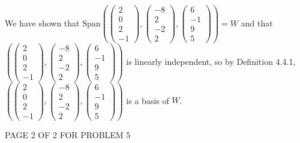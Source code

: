 \documentclass[12pt]{article}
\newenvironment{problem}[2][Problem]
{
	\begin{trivlist} 
		\item[\hskip \labelsep {\bfseries #1 #2:}]
	}
{
	\end{trivlist}
	}
\begin{document}
\begin{problem}{5}
We have shown that $\text{Span}\left( \begin{pmatrix} 2\\0\\2\\-1 \end{pmatrix}, \begin{pmatrix} -8\\2\\-2\\2 \end{pmatrix}, \begin{pmatrix} 6\\-1\\9\\5 \end{pmatrix} \right)=W$ and that $\left( \begin{pmatrix} 2\\0\\2\\-1 \end{pmatrix}, \begin{pmatrix} -8\\2\\-2\\2 \end{pmatrix}, \begin{pmatrix} 6\\-1\\9\\5 \end{pmatrix} \right)$ is linearly independent, so by Definition 4.4.1, $\left( \begin{pmatrix} 2\\0\\2\\-1 \end{pmatrix}, \begin{pmatrix} -8\\2\\-2\\2 \end{pmatrix}, \begin{pmatrix} 6\\-1\\9\\5 \end{pmatrix} \right)$ is a basis of $W$.
\vfill
\centerline{PAGE 2 OF 2 FOR PROBLEM 5}

\end{problem}
\end{document}
